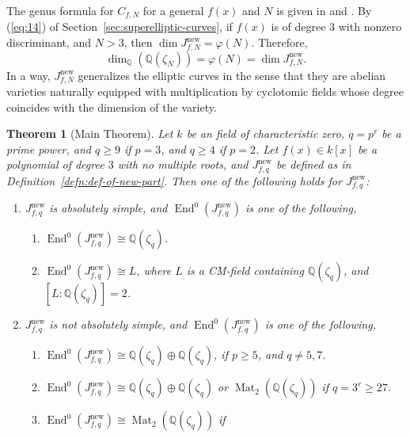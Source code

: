 \documentclass{amsart}[11pt]
\newtheorem{thm}{Theorem}[section]
\theoremstyle{definition}
\numberwithin{equation}{section}
\theoremstyle{notitle}
\begin{document}
The genus formula for $C_{f,N}$ for a general $f(x)$ and $N$ is given
in \cite{MR1107394} and \cite{MR1357406}. 
By (\ref{eq:14}) of Section~\ref{sec:superelliptic-curves}, if $f(x)$
is of degree 3 with nonzero discriminant, and $N>3$, then $\dim J_{f,N}^{\mathrm{new}}= \varphi(N)$.
Therefore,
\[\dim_{\mathbb{Q}}({\mathbb{Q}}(\zeta_N))=\varphi(N)=\dim J_{f,N}^{\mathrm{new}}.\]
In a way, $J_{f,N}^{\mathrm{new}}$ generalizes the elliptic curves in the sense
that they are abelian varieties naturally equipped with multiplication
by cyclotomic fields whose degree coincides with the dimension of the
 variety.

\begin{thm}[Main Theorem]\label{thm:main}
  Let $k$ be an field of characteristic zero, $q=p^r$ be a prime
  power, and $q\geq 9$ if $p=3$, and $q\geq 4$ if $p=2$.  Let $f(x)\in
  k[x]$ be a polynomial of degree $3$ with no multiple roots, and
  $J_{f,q}^{\mathrm{new}}$ be defined as in
  Definition~\ref{defn:def-of-new-part}.  Then one of the following
  holds for $J_{f,q}^{\mathrm{new}}$:
  \begin{enumerate}
  \item $J_{f,q}^{\mathrm{new}}$ is absolutely simple, and $\operatorname{End}^0(J_{f,q}^{\mathrm{new}})$ is
    one of the following,
    \begin{enumerate}
    \item[(1a)] $\operatorname{End}^0(J_{f,q}^{\mathrm{new}})\cong{\mathbb{Q}}(\zeta_q)$. 
    \item[(1b)] $\operatorname{End}^0(J_{f,q}^{\mathrm{new}})\cong L$, where $L$ is a CM-field containing
      ${\mathbb{Q}}(\zeta_q)$, and\\ $[L:{\mathbb{Q}}(\zeta_q)]=2$.
    \end{enumerate}
  \item $J_{f,q}^{\mathrm{new}}$ is not absolutely simple, and
    $\operatorname{End}^0(J_{f,q}^{\mathrm{new}})$ is one of the following,
    \begin{enumerate}
     \item[(2a)] $\operatorname{End}^0(J_{f,q}^{\mathrm{new}})\cong {\mathbb{Q}}(\zeta_q)\oplus
       {\mathbb{Q}}(\zeta_q)$, if $p\geq 5$, and $q\neq 5, 7$. 
     \item[(2b)] $\operatorname{End}^0(J_{f,q}^{\mathrm{new}})\cong {\mathbb{Q}}(\zeta_q)\oplus {\mathbb{Q}}(\zeta_q)$ or
       $\operatorname{Mat}_2({\mathbb{Q}}(\zeta_q))$  if $q=3^r\geq 27$. 
    \item[(2c)]  $\operatorname{End}^0(J_{f,q}^{\mathrm{new}})\cong  \operatorname{Mat}_2({\mathbb{Q}}(\zeta_q))$ if

\end{enumerate}
\end{enumerate}
\end{thm}
\end{document}
